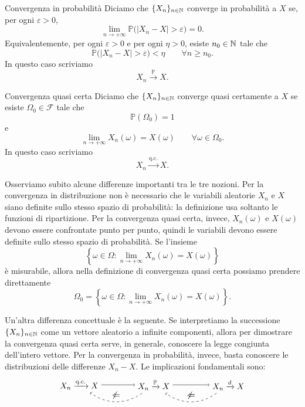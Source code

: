 \documentclass[a4paper]{article}
\begin{document}
\begin{snippetdefinition}{Convergenza in probabilità}
    Diciamo che \(\{X_n\}_{n\in\mathbb{N}}\) converge in probabilità a \(X\) se, per ogni \(\varepsilon>0\),
    \[
        \lim_{n\to+\infty}\mathbb{P}\bigl(|X_n-X|>\varepsilon\bigr)=0.
    \]
    Equivalentemente, per ogni \(\varepsilon>0\) e per ogni \(\eta>0\), esiste \(n_0\in\mathbb{N}\) tale che
    \[
        \mathbb{P}\bigl(|X_n-X|>\varepsilon\bigr)<\eta
        \qquad
        \forall n\geq n_0.
    \]
    In questo caso scriviamo
    \[
        X_n \xrightarrow{\mathbb{P}} X.
    \]
\end{snippetdefinition}

\begin{snippetdefinition}{Convergenza quasi certa}
    Diciamo che \(\{X_n\}_{n\in\mathbb{N}}\) converge quasi certamente a \(X\) se esiste \(\Omega_0\in\mathcal{F}\) tale che
    \[
        \mathbb{P}(\Omega_0)=1
    \]
    e
    \[
        \lim_{n\to+\infty}X_n(\omega)=X(\omega)
        \qquad
        \forall \omega\in\Omega_0.
    \]
    In questo caso scriviamo
    \[
        X_n \xrightarrow{\text{q.c.}} X.
    \]
\end{snippetdefinition}

Osserviamo subito alcune differenze importanti tra le tre nozioni.
Per la convergenza in distribuzione non è necessario che le variabili aleatorie \(X_n\) e \(X\) siano definite sullo stesso spazio di probabilità: la definizione usa soltanto le funzioni di ripartizione.
Per la convergenza quasi certa, invece, \(X_n(\omega)\) e \(X(\omega)\) devono essere confrontate punto per punto, quindi le variabili devono essere definite sullo stesso spazio di probabilità.
Se l'insieme
\[
    \left\{\omega\in\Omega:\lim_{n\to+\infty}X_n(\omega)=X(\omega)\right\}
\]
è misurabile, allora nella definizione di convergenza quasi certa possiamo prendere direttamente
\[
    \Omega_0=
    \left\{\omega\in\Omega:\lim_{n\to+\infty}X_n(\omega)=X(\omega)\right\}.
\]

Un'altra differenza concettuale è la seguente. Se interpretiamo la successione \(\{X_n\}_{n\in\mathbb{N}}\) come un vettore aleatorio a infinite componenti, allora per dimostrare la convergenza quasi certa serve, in generale, conoscere la legge congiunta dell'intero vettore. Per la convergenza in probabilità, invece, basta conoscere le distribuzioni delle differenze \(X_n-X\).
Le implicazioni fondamentali sono:
\[
    \begin{tikzpicture}[baseline=(current bounding box.center), node distance=3.2cm]
        \node (qc) {\(X_n\xrightarrow{\text{q.c.}}X\)};
        \node[right of=qc] (p) {\(X_n\xrightarrow{\mathbb{P}}X\)};
        \node[right of=p] (d) {\(X_n\xrightarrow{d}X\)};
        \draw[->] (qc) -- (p);
        \draw[->] (p) -- (d);
        \draw[->, dashed] (p) to[bend left=35] node[above] {\(\not\Leftarrow\)} (qc);
        \draw[->, dashed] (d) to[bend left=35] node[above] {\(\not\Leftarrow\)} (p);
    \end{tikzpicture}
\]
\end{document}
